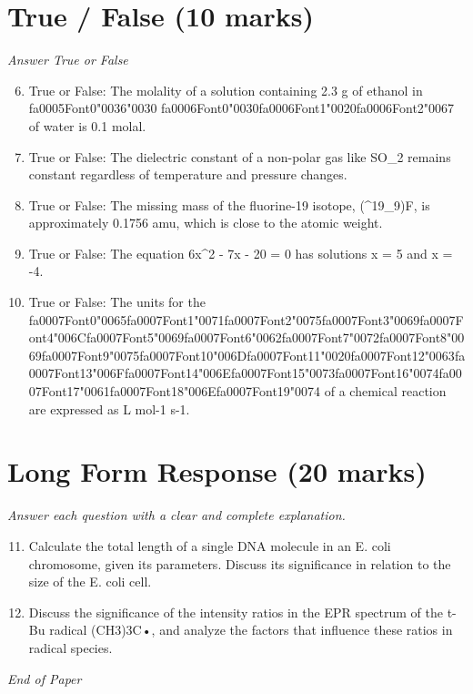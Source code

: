 \documentclass[12pt]{article}
\begin{document}
\section*{True / False (10 marks)}
\textit{Answer True or False}
\begin{enumerate}[label=\arabic*.]
\setcounter{enumi}{5}
\item True or False: The molality of a solution containing 2.3 g of ethanol in {\csname fa0005Font0\endcsname\char"0036}{\char"0030} {\csname fa0006Font0\endcsname\char"0030}{\csname fa0006Font1\endcsname\char"0020}{\csname fa0006Font2\endcsname\char"0067} of water is 0.1 molal.
\item True or False: The dielectric constant of a non-polar gas like SO\_2 remains constant regardless of temperature and pressure changes.
\item True or False: The missing mass of the fluorine-19 isotope, (\^{}19\_9)F, is approximately 0.1756 amu, which is close to the atomic weight.
\item True or False: The equation 6x\^{}2 - 7x - 20 = 0 has solutions x = 5 and x = -4.
\item True or False: The units for the {\csname fa0007Font0\endcsname\char"0065}{\csname fa0007Font1\endcsname\char"0071}{\csname fa0007Font2\endcsname\char"0075}{\csname fa0007Font3\endcsname\char"0069}{\csname fa0007Font4\endcsname\char"006C}{\csname fa0007Font5\endcsname\char"0069}{\csname fa0007Font6\endcsname\char"0062}{\csname fa0007Font7\endcsname\char"0072}{\csname fa0007Font8\endcsname\char"0069}{\csname fa0007Font9\endcsname\char"0075}{\csname fa0007Font10\endcsname\char"006D}{\csname fa0007Font11\endcsname\char"0020}{\csname fa0007Font12\endcsname\char"0063}{\csname fa0007Font13\endcsname\char"006F}{\csname fa0007Font14\endcsname\char"006E}{\csname fa0007Font15\endcsname\char"0073}{\csname fa0007Font16\endcsname\char"0074}{\csname fa0007Font17\endcsname\char"0061}{\csname fa0007Font18\endcsname\char"006E}{\csname fa0007Font19\endcsname\char"0074} of a chemical reaction are expressed as L mol-1 s-1.
\end{enumerate}

\section*{Long Form Response (20 marks)}
\textit{Answer each question with a clear and complete explanation.}
\begin{enumerate}[label=\arabic*.]
\setcounter{enumi}{10}
\item Calculate the total length of a single DNA molecule in an E. coli chromosome, given its
parameters. Discuss its significance in relation to the size of the E. coli cell.
\item Discuss the significance of the intensity ratios in the EPR spectrum of the t-Bu radical
(CH3)3C•, and analyze the factors that influence these ratios in radical species.
\end{enumerate}

\vfill
\noindent\textit{End of Paper}
\end{document}
